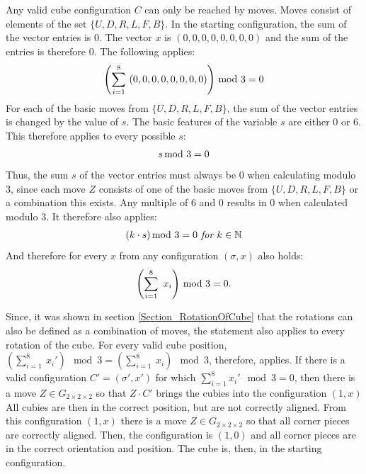 \documentclass[12pt,a4paper]{article}
\theoremstyle{custom}
\newcommand{\Gtwo}{\ensuremath{G_{2\times 2\times 2}}}
\begin{document}
Any valid cube configuration $C$ can only be reached by moves. Moves consist of elements of the set $\{U, D, R, L, F, B\}$. In the starting configuration, the sum of the vector entries is $0$. The vector $x$ is $(0,0,0,0,0,0,0,0)$ and the sum of the entries is therefore 0. The following applies:
\begin{align*}
\left( \sum_{i= 1}^{8} \ (0,0,0,0,0,0,0,0) \right) \hspace*{-0.5em} \mod 3 = 0
\end{align*}
For each of the basic moves from $\{U, D, R, L, F, B\}$, the sum of the vector entries is changed by the value of $s$. The basic features of the variable $s$ are either 0 or 6. This therefore applies to every possible $s$:
\begin{align*}
s \hspace*{-0.5em} \mod 3 = 0
\end{align*}
Thus, the sum $s$ of the vector entries must always be 0 when calculating modulo 3, since each move $Z$ consists of one of the basic moves from $\{U, D, R, L, F, B\}$ or a combination this exists. Any multiple of 6 and 0 results in 0 when calculated modulo 3. It therefore also applies:
\begin{align*}
(k \cdot s) \hspace*{-0.5em} \mod 3 = 0 \textit{ for } k \in \mathbb{N}
\end{align*}
And therefore for every $x$ from any configuration $(\sigma, x)$ also holds:
\begin{align*}
\left( \sum_{i= 1}^{8} \ x_i \right) \hspace*{-0.5em} \mod 3 = 0.
\end{align*}

Since, it was shown in section \ref{Section_RotationOfCube} that the rotations can also be defined as a combination of moves, the statement also applies to every rotation of the cube.
For every valid cube position, ${(\sum_{i = 1}^{8} \ x_i') \mod 3 = (\sum_{i = 1}^{8} \ x_i) \mod 3 }$, therefore, applies.
If there is a valid configuration $C'=(\sigma', x')$ for which $\sum_{i = 1}^{8} x_i' \mod 3 = 0$, then there is a move $Z \in \Gtwo$ so that $Z \cdot C'$ brings the cubies into the configuration $(1,x)$ All cubies are then in the correct position, but are not correctly aligned.
From this configuration $(1,x)$ there is a move $Z \in \Gtwo$ so that all corner pieces are correctly aligned. Then, the configuration is $(1, 0)$ and all corner pieces are in the correct orientation and position. The cube is, then, in the starting configuration.
\end{document}
